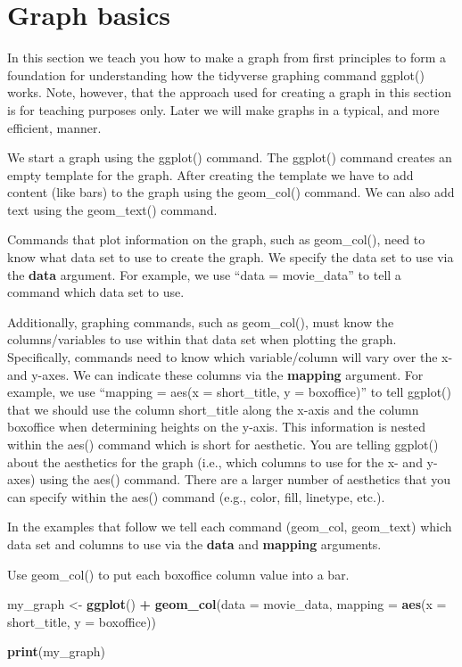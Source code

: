 \documentclass[
]{krantz}
\makeatletter
\newenvironment{Shaded}{\begin{snugshade}}{\end{snugshade}}
\newcommand{\DataTypeTok}[1]{\textcolor[rgb]{0.27,0.27,0.27}{#1}}
\newcommand{\KeywordTok}[1]{\textcolor[rgb]{0.27,0.27,0.27}{\textbf{#1}}}
\newcommand{\NormalTok}[1]{#1}
\newcommand{\OperatorTok}[1]{\textcolor[rgb]{0.43,0.43,0.43}{\textbf{#1}}}
\newcommand{\StringTok}[1]{\textcolor[rgb]{0.5,0.5,0.5}{#1}}
\newenvironment{kframe}{%
\medskip{}
\setlength{\fboxsep}{.8em}
 \def\at@end@of@kframe{}%
 \ifinner\ifhmode%
  \def\at@end@of@kframe{\end{minipage}}%
  \begin{minipage}{\columnwidth}%
 \fi\fi%
 \def\FrameCommand##1{\hskip\@totalleftmargin \hskip-\fboxsep
 \colorbox{shadecolor}{##1}\hskip-\fboxsep
     \hskip-\linewidth \hskip-\@totalleftmargin \hskip\columnwidth}%
 \MakeFramed {\advance\hsize-\width
   \@totalleftmargin\z@ \linewidth\hsize
   \@setminipage}}%
 {\par\unskip\endMakeFramed%
 \at@end@of@kframe}
\renewenvironment{Shaded}{\begin{kframe}}{\end{kframe}}
\makeatother
\begin{document}
\hypertarget{graph-basics}{%
\section{Graph basics}\label{graph-basics}}

In this section we teach you how to make a graph from first principles to form a foundation for understanding how the tidyverse graphing command ggplot() works. Note, however, that the approach used for creating a graph in this section is for teaching purposes only. Later we will make graphs in a typical, and more efficient, manner.

We start a graph using the ggplot() command. The ggplot() command creates an empty template for the graph. After creating the template we have to add content (like bars) to the graph using the geom\_col() command. We can also add text using the geom\_text() command.

Commands that plot information on the graph, such as geom\_col(), need to know what data set to use to create the graph. We specify the data set to use via the \textbf{data} argument. For example, we use ``data = movie\_data'' to tell a command which data set to use.

Additionally, graphing commands, such as geom\_col(), must know the columns/variables to use within that data set when plotting the graph. Specifically, commands need to know which variable/column will vary over the x- and y-axes. We can indicate these columns via the \textbf{mapping} argument. For example, we use ``mapping = aes(x = short\_title, y = boxoffice)'' to tell ggplot() that we should use the column short\_title along the x-axis and the column boxoffice when determining heights on the y-axis. This information is nested within the aes() command which is short for aesthetic. You are telling ggplot() about the aesthetics for the graph (i.e., which columns to use for the x- and y-axes) using the aes() command. There are a larger number of aesthetics that you can specify within the aes() command (e.g., color, fill, linetype, etc.).

In the examples that follow we tell each command (geom\_col, geom\_text) which data set and columns to use via the \textbf{data} and \textbf{mapping} arguments.

Use geom\_col() to put each boxoffice column value into a bar.

\begin{Shaded}
\begin{Highlighting}[]
\NormalTok{my_graph <-}\StringTok{ }\KeywordTok{ggplot}\NormalTok{() }\OperatorTok{+}
\StringTok{  }\KeywordTok{geom_col}\NormalTok{(}\DataTypeTok{data =}\NormalTok{ movie_data,}
           \DataTypeTok{mapping =} \KeywordTok{aes}\NormalTok{(}\DataTypeTok{x =}\NormalTok{ short_title, }
                         \DataTypeTok{y =}\NormalTok{ boxoffice))}

\KeywordTok{print}\NormalTok{(my_graph)}
\end{Highlighting}
\end{Shaded}
\end{document}
